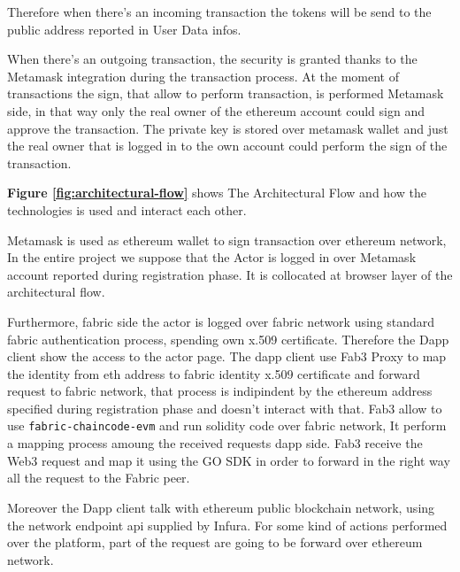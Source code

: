 Therefore when there's an incoming transaction the tokens will be send to the public address reported in User Data infos. 
\newline

When there's an outgoing transaction, the security is granted thanks to the Metamask integration during the transaction process. At the 
moment of transactions the sign, that allow to perform transaction, is performed Metamask side, in that way only the real owner of the ethereum account
could sign and approve the transaction. The private key is stored over metamask wallet and just the real
owner that is logged in to the own account could perform the sign of the transaction. 
\bigskip

\textbf{Figure \ref{fig:architectural-flow}} shows The Architectural Flow and how the technologies is used and interact each other.

Metamask is used as ethereum wallet to sign transaction over ethereum network, In the entire project we suppose
that the Actor is logged in over Metamask account reported during registration phase. It is collocated
at browser layer of the architectural flow.  

Furthermore, fabric side the actor is logged over fabric network using standard fabric authentication
process, spending own x.509 certificate. Therefore the Dapp client show the access to the actor page.
The dapp client use Fab3 Proxy to map the identity from eth address to fabric
identity x.509 certificate and forward request to fabric network, that process is indipindent by the ethereum address
specified during registration phase and doesn't interact with that. Fab3 allow to use \texttt{fabric-chaincode-evm} 
and run solidity code over fabric network, It perform a mapping process amoung the received requests dapp side.
Fab3 receive the Web3 request and map it using the GO SDK in order to forward in the right way all the request
to the Fabric peer. 
\bigskip

Moreover the Dapp client talk with ethereum public blockchain network, using the network endpoint api supplied by Infura. 
For some kind of actions performed over the platform, part of the request are going to be forward over
ethereum network. 

